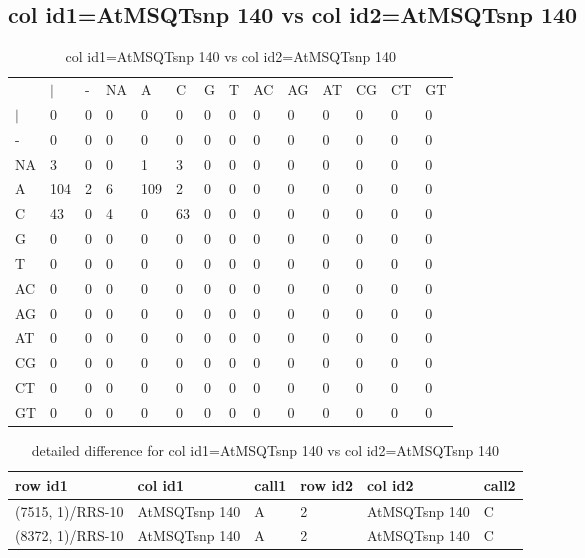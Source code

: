 \subsection{col id1=AtMSQTsnp 140 vs col id2=AtMSQTsnp 140}
\begin{center}
\begin{longtable}{|l|l|l|l|l|l|l|l|l|l|l|l|l|l|}
\caption{col id1=AtMSQTsnp 140 vs col id2=AtMSQTsnp 140} \label{table_dm716}\\
\hline
\\
\hline
&$|$&-&NA&A&C&G&T&AC&AG&AT&CG&CT&GT\\
$|$&0&0&0&0&0&0&0&0&0&0&0&0&0\\
-&0&0&0&0&0&0&0&0&0&0&0&0&0\\
NA&3&0&0&1&3&0&0&0&0&0&0&0&0\\
A&104&2&6&109&2&0&0&0&0&0&0&0&0\\
C&43&0&4&0&63&0&0&0&0&0&0&0&0\\
G&0&0&0&0&0&0&0&0&0&0&0&0&0\\
T&0&0&0&0&0&0&0&0&0&0&0&0&0\\
AC&0&0&0&0&0&0&0&0&0&0&0&0&0\\
AG&0&0&0&0&0&0&0&0&0&0&0&0&0\\
AT&0&0&0&0&0&0&0&0&0&0&0&0&0\\
CG&0&0&0&0&0&0&0&0&0&0&0&0&0\\
CT&0&0&0&0&0&0&0&0&0&0&0&0&0\\
GT&0&0&0&0&0&0&0&0&0&0&0&0&0\\
\hline
\end{longtable}
\end{center}

\begin{center}
\begin{longtable}{|l|l|l|l|l|l|}
\caption{detailed difference for col id1=AtMSQTsnp 140 vs col id2=AtMSQTsnp 140} \label{table_dm717}\\
\hline
row id1&col id1&call1&row id2&col id2&call2\\
\hline
(7515, 1)/RRS-10&AtMSQTsnp 140&A&2&AtMSQTsnp 140&C\\
(8372, 1)/RRS-10&AtMSQTsnp 140&A&2&AtMSQTsnp 140&C\\
\hline
\end{longtable}
\end{center}

